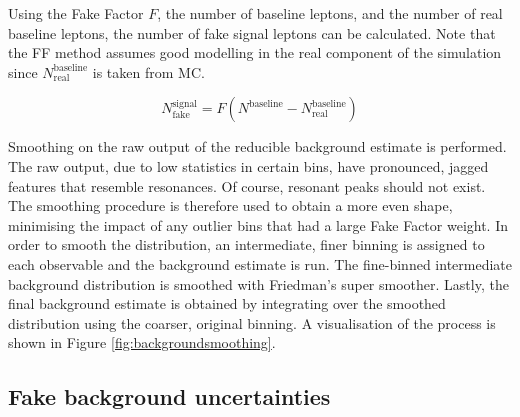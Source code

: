 Using the Fake Factor $F$, the number of baseline leptons, and the number of real baseline leptons, the number of fake signal leptons can be calculated. Note that the FF method assumes good modelling in the real component of the simulation since $N^{\text{baseline}}_{\text{real}}$ is taken from MC.

$$N_{\text{fake}}^{\text{signal}} = F(N^{\text{baseline}}-N^{\text{baseline}}_{\text{real}})$$


Smoothing on the raw output of the reducible background estimate is performed. The raw output, due to low statistics in certain bins, have pronounced, jagged features that resemble resonances. Of course, resonant peaks should not exist. The smoothing procedure is therefore used to obtain a more even shape, minimising the impact of any outlier bins that had a large Fake Factor weight. In order to smooth the distribution, an intermediate, finer binning is assigned to each observable and the background estimate is run. The fine-binned intermediate background distribution is smoothed with Friedman's super smoother. Lastly, the final background estimate is obtained by integrating over the smoothed distribution using the coarser, original binning. A visualisation of the process is shown in Figure \ref{fig:backgroundsmoothing}.


\subsection{Fake background uncertainties}
\label{ssec:fakeuncertainty}

